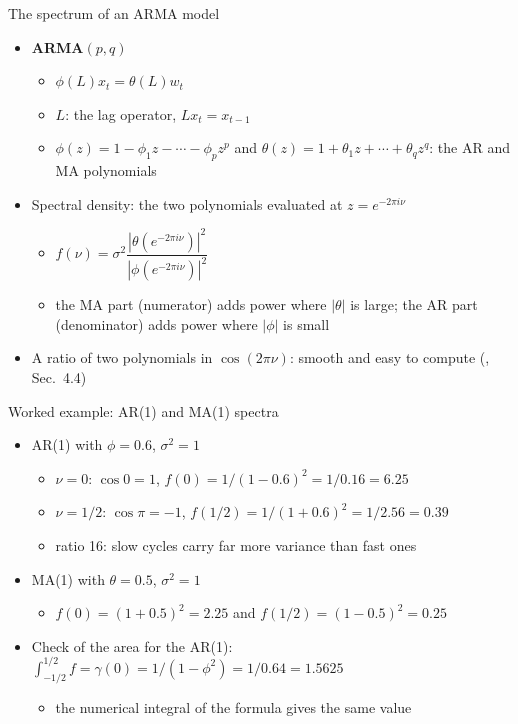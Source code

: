 \begin{frame}{The spectrum of an ARMA model}
\itemsize{\small}
\begin{itemize}
    \item \textbf{ARMA}$(p,q)$
    \begin{itemize}
        \item $\phi(L)x_t = \theta(L)w_t$
        \item $L$: the lag operator, $Lx_t = x_{t-1}$
        \item $\phi(z) = 1 - \phi_1 z - \cdots - \phi_p z^p$ and $\theta(z) = 1 + \theta_1 z + \cdots + \theta_q z^q$: the AR and MA polynomials
    \end{itemize}
    \item Spectral density: the two polynomials evaluated at $z = e^{-2\pi i\nu}$
    \begin{itemize}
        \item $f(\nu) = \sigma^2\dfrac{|\theta(e^{-2\pi i\nu})|^2}{|\phi(e^{-2\pi i\nu})|^2}$
        \item the MA part (numerator) adds power where $|\theta|$ is large; the AR part (denominator) adds power where $|\phi|$ is small
    \end{itemize}
    \item A ratio of two polynomials in $\cos(2\pi\nu)$: smooth and easy to compute (, Sec.~4.4)
\end{itemize}
\end{frame}

\begin{frame}{Worked example: AR(1) and MA(1) spectra}
\itemsize{\small}
\begin{itemize}
    \item AR(1) with $\phi = 0.6$, $\sigma^2 = 1$
    \begin{itemize}
        \item $\nu = 0$: $\cos 0 = 1$, $f(0) = 1/(1 - 0.6)^2 = 1/0.16 = 6.25$
        \item $\nu = 1/2$: $\cos\pi = -1$, $f(1/2) = 1/(1 + 0.6)^2 = 1/2.56 = 0.39$
        \item ratio 16: slow cycles carry far more variance than fast ones
    \end{itemize}
    \item MA(1) with $\theta = 0.5$, $\sigma^2 = 1$
    \begin{itemize}
        \item $f(0) = (1 + 0.5)^2 = 2.25$ and $f(1/2) = (1 - 0.5)^2 = 0.25$
    \end{itemize}
    \item Check of the area for the AR(1): $\int_{-1/2}^{1/2} f = \gamma(0) = 1/(1 - \phi^2) = 1/0.64 = 1.5625$
    \begin{itemize}
        \item the numerical integral of the formula gives the same value
    \end{itemize}
\end{itemize}
\end{frame}

